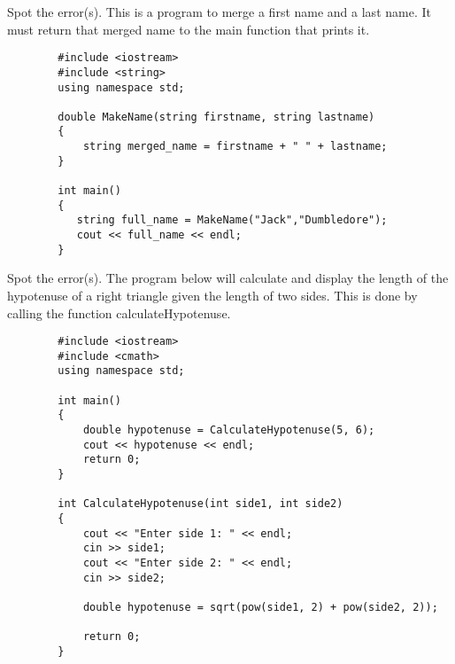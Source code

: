 \begin{problem}
    Spot the error(s). This is a program to merge a first name and a last name. It must return that merged name to the main function that prints it. 
    \begin{verbatim}
        #include <iostream>
        #include <string>
        using namespace std;
        
        double MakeName(string firstname, string lastname)
        {
            string merged_name = firstname + " " + lastname;
        }
        
        int main()
        {
           string full_name = MakeName("Jack","Dumbledore");
           cout << full_name << endl;
        }

    \end{verbatim}
\end{problem}

\begin{problem}
    Spot the error(s). The program below will calculate and display the length of the hypotenuse of a right triangle given the length of two sides. This is done by calling the function calculateHypotenuse.


    \begin{verbatim}
        #include <iostream>
        #include <cmath>
        using namespace std;
        
        int main()
        {
            double hypotenuse = CalculateHypotenuse(5, 6);
            cout << hypotenuse << endl;
            return 0;
        }
        
        int CalculateHypotenuse(int side1, int side2)
        {
            cout << "Enter side 1: " << endl;
            cin >> side1;
            cout << "Enter side 2: " << endl;
            cin >> side2;
        
            double hypotenuse = sqrt(pow(side1, 2) + pow(side2, 2));
        
            return 0;
        }

    \end{verbatim}
\end{problem}


        
